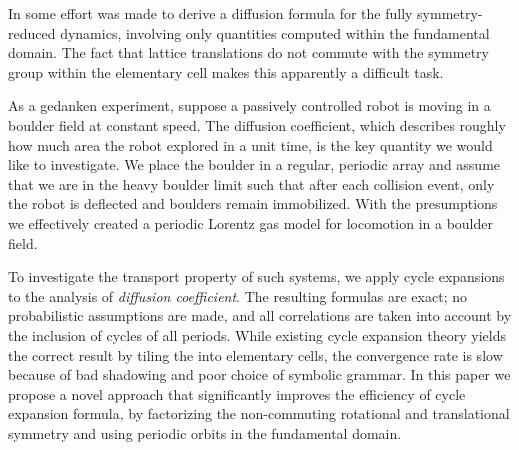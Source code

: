 

In  some effort was made to derive a diffusion
formula for the fully symmetry-reduced dynamics, involving only
quantities computed within the fundamental domain. The fact that lattice
translations do not commute with the symmetry group within the elementary
cell makes this apparently a difficult task.

As a gedanken experiment, suppose a passively controlled robot is moving
in a boulder field at constant speed. The diffusion coefficient, which
describes roughly how much area the robot explored in a unit time, is the
key quantity we would like to investigate. We place the boulder in a
regular, periodic array and assume that we are in the heavy boulder limit
such that after each collision event, only the robot is deflected and
boulders remain immobilized. With the presumptions we effectively created
a periodic Lorentz gas model for locomotion in a boulder
field.

To investigate the transport property of such systems, we apply cycle
expansions to the analysis of {\em diffusion coefficient}.
The resulting formulas are exact; no probabilistic assumptions are made,
and all correlations are taken into account by the  inclusion of cycles
of all periods. While existing cycle expansion theory yields the correct
result by tiling the {\statesp} into elementary cells, the convergence
rate is slow because of bad shadowing and poor choice of symbolic
grammar. In this paper we propose a novel approach that
significantly improves the efficiency of cycle expansion formula, by
factorizing the non-commuting rotational and translational symmetry and
using periodic orbits in the fundamental domain.

